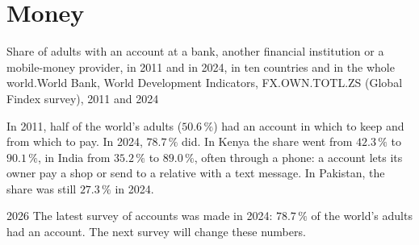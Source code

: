 \chapter{Money}\label{ch:g7:money}

\begin{openingchart}{Share of adults with an account at a bank, another financial
institution or a mobile-money provider, in 2011 and in 2024, in ten countries and in
the whole world.}{World Bank, World Development Indicators, FX.OWN.TOTL.ZS (Global
Findex survey), 2011 and 2024}
\end{openingchart}

In 2011, half of the world's adults ($50.6\,\%$) had an account in which to keep 
and from which to pay. In 2024, $78.7\,\%$ did. In Kenya the share went from $42.3\,\%$
to $90.1\,\%$, in India from $35.2\,\%$ to $89.0\,\%$, often through a phone: a
 account lets its owner pay a shop or send  to a relative with a text
message. In Pakistan, the share was still $27.3\,\%$ in 2024.

\begin{dated}{2026}
The latest survey of accounts was made in 2024: $78.7\,\%$ of the world's adults had an
account. The next survey will change these numbers.
\end{dated}

